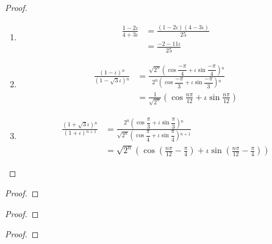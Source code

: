 \documentclass[class=linearalgebra,crop=false]{standalone}
\begin{document}
\begin{proof}
    \begin{enumerate}[label = (\alph*)]
        \item \begin{align*}
            \frac{1 - 2\iota}{4 + 3\iota} &= \frac{(1 - 2\iota)(4 - 3\iota)}{25} \\
                                              &= \frac{-2 - 11\iota}{25}
        \end{align*}
        \item \begin{align*}
            \frac{(1 - \iota){}^{n}}{(1 - \sqrt{3}\iota){}^{n}} &= \frac{\sqrt{2^{n}}\left(\cos\dfrac{-\pi}{4} +\iota\sin\dfrac{-\pi}{4}\right){}^{n}}{2^{n}\left(\cos\dfrac{-\pi}{3} + \iota\sin\dfrac{-\pi}{3}\right){}^{n}} \\
                &=\frac{1}{\sqrt{2^{n}}}\left(\cos\frac{n\pi}{12}+\iota\sin\frac{n\pi}{12}\right)
        \end{align*}
        \item \begin{align*}
            \frac{(1 + \sqrt{3}\iota){}^{n}}{(1+\iota){}^{n+1}} &= \frac{2^{n}\left(\cos\dfrac{\pi}{3} + \iota\sin\dfrac{\pi}{3}\right){}^{n}}{\sqrt{2^{n}}\left(\cos\dfrac{\pi}{4} + \iota\sin\dfrac{\pi}{4}\right){}^{n+1}} \\
            &= \sqrt{2^{n}}\left(\cos\left(\frac{n\pi}{12}-\frac{\pi}{4}\right) + \iota\sin\left(\frac{n\pi}{12} - \frac{\pi}{4}\right)\right)
        \end{align*}
    \end{enumerate}
\end{proof}

\begin{exercise}
\end{exercise}

\begin{proof}
\end{proof}

\begin{exercise}
\end{exercise}

\begin{proof}
\end{proof}

\begin{exercise}
\end{exercise}

\begin{proof}
\end{proof}
\end{document}

